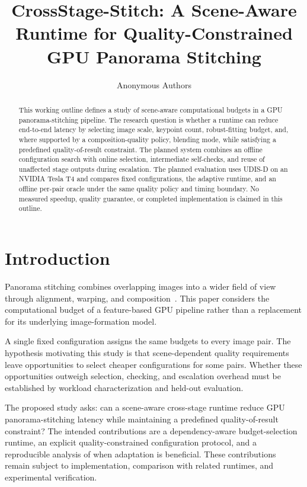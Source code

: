 \documentclass[a4paper,UKenglish,cleveref,autoref,anonymous]{oasics-v2021}
\title{CrossStage-Stitch: A Scene-Aware Runtime for Quality-Constrained GPU Panorama Stitching}
\author{Anonymous Authors}{Anonymous affiliation}{}{}{}
\begin{document}
\maketitle

\begin{abstract}
This working outline defines a study of scene-aware computational budgets in a
GPU panorama-stitching pipeline. The research question is whether a runtime can
reduce end-to-end latency by selecting image scale, keypoint count, robust-fitting
budget, and, where supported by a composition-quality policy, blending mode,
while satisfying a predefined quality-of-result constraint. The planned system
combines an offline configuration search with online selection, intermediate
self-checks, and reuse of unaffected stage outputs during escalation. The
planned evaluation uses UDIS-D on an NVIDIA Tesla T4 and compares fixed
configurations, the adaptive runtime, and an offline per-pair oracle under the
same quality policy and timing boundary. No measured speedup, quality guarantee,
or completed implementation is claimed in this outline.
\end{abstract}

\section{Introduction}
\label{sec:introduction}
Panorama stitching combines overlapping images into a wider field of view through
alignment, warping, and composition~\cite{brown2007stitching}. This paper considers
the computational budget of a feature-based GPU pipeline rather than a replacement
for its underlying image-formation model.

A single fixed configuration assigns the same budgets to every image pair.
The hypothesis motivating this study is that scene-dependent quality requirements
leave opportunities to select cheaper configurations for some pairs. Whether
these opportunities outweigh selection, checking, and escalation overhead must
be established by workload characterization and held-out evaluation.

The proposed study asks: can a scene-aware cross-stage runtime reduce GPU
panorama-stitching latency while maintaining a predefined quality-of-result
constraint? The intended contributions are a dependency-aware budget-selection
runtime, an explicit quality-constrained configuration protocol, and a reproducible
analysis of when adaptation is beneficial. These contributions remain subject to
implementation, comparison with related runtimes, and experimental verification.
\end{document}

